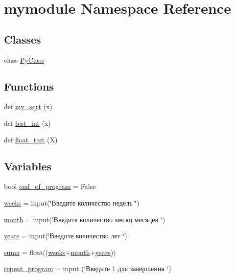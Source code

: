 \hypertarget{namespacemymodule}{}\section{mymodule Namespace Reference}
\label{namespacemymodule}
\subsection*{Classes}
\begin{DoxyCompactItemize}
\item 
class \hyperlink{classmymodule_1_1_py_class}{Py\+Class}
\end{DoxyCompactItemize}
\subsection*{Functions}
\begin{DoxyCompactItemize}
\item 
def \hyperlink{namespacemymodule_acbe5bf6a26ef15cacf89de54f5ce9e2c}{my\+\_\+sqrt} (x)
\item 
def \hyperlink{namespacemymodule_a12cb324c71a9dfc9bd08f36864f77acf}{test\+\_\+int} (x)
\item 
def \hyperlink{namespacemymodule_a95bb68754e76a49c40edd5dc05c24bdd}{float\+\_\+test} (X)
\end{DoxyCompactItemize}
\subsection*{Variables}
\begin{DoxyCompactItemize}
\item 
bool \hyperlink{namespacemymodule_a1e213dd23d342fd86fdf1b3f0cb7cd11}{end\+\_\+of\+\_\+program} = False
\item 
\hyperlink{namespacemymodule_aaf8ad6924feda908422ed7502d97c2f5}{weeks} = input(\char`\"{}Введите количество недель \char`\"{})
\item 
\hyperlink{namespacemymodule_a773d7ebbde62af8bcd9dfc0ce6cdeda8}{month} = input(\char`\"{}Введите количество месяц месяцев \char`\"{})
\item 
\hyperlink{namespacemymodule_aa9e1e22a07835d9e58ca7299410ff2c1}{years} = input(\char`\"{}Введите количество лет \char`\"{})
\item 
\hyperlink{namespacemymodule_a37055f99ce2a78a93a76df9065f10dfe}{suma} = float((\hyperlink{namespacemymodule_aaf8ad6924feda908422ed7502d97c2f5}{weeks}+\hyperlink{namespacemymodule_a773d7ebbde62af8bcd9dfc0ce6cdeda8}{month}+\hyperlink{namespacemymodule_aa9e1e22a07835d9e58ca7299410ff2c1}{years}))
\item 
\hyperlink{namespacemymodule_aeb351b5a4b23c6ec88d987a0edbed30b}{repeat\+\_\+program} = input (\char`\"{}Введите 1 для завершения \char`\"{})
\end{DoxyCompactItemize}


